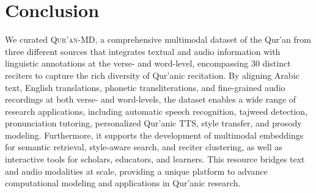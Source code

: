 \section{Conclusion}
\label{sec:conclusion}

We curated \textsc{Qur’an-MD}, a comprehensive multimodal dataset of the Qur’an from three different sources that integrates textual and audio information with linguistic annotations at the verse- and word-level, encompassing 30 distinct reciters to capture the rich diversity of Qur’anic recitation. By aligning Arabic text, English translations, phonetic transliterations, and fine-grained audio recordings at both verse- and word-levels, the dataset enables a wide range of research applications, including automatic speech recognition, tajweed detection, pronunciation tutoring, personalized Qur’anic TTS, style transfer, and prosody modeling. Furthermore, it supports the development of multimodal embeddings for semantic retrieval, style-aware search, and reciter clustering, as well as interactive tools for scholars, educators, and learners. This resource bridges text and audio modalities at scale, providing a unique platform to advance computational modeling and applications in Qur’anic research.
